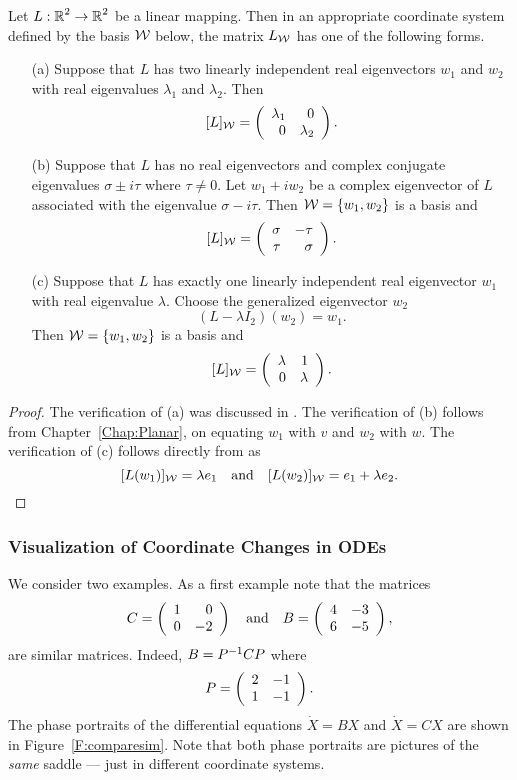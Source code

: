 \documentclass{ximera}
\begin{document}
\begin{thm}  \label{T:putinform2}
Let $L:\mbox{$\Bbb{R}$}^2\to\mbox{$\Bbb{R}$}^2$ be a linear mapping.  Then in an appropriate
coordinate system defined by the basis ${\cal W}$ below, the matrix
$L_{\cal W}$ has one of the following forms.
\begin{itemize}
\item[(a)]	Suppose that $L$ has two linearly independent
real eigenvectors $w_1$ and $w_2$ with real eigenvalues $\lambda_1$
and $\lambda_2$.  Then
\[
[L]_{\cal W} = \left(\begin{array}{rr} \lambda_1 & 0\\ 0 &\lambda_2\end{array}\right).
\]

\item[(b)]	Suppose that $L$ has no real eigenvectors and
complex conjugate eigenvalues $\sigma\pm i\tau$ where
$\tau\neq 0$.  Let $w_1+iw_2$ be a complex eigenvector of $L$
associated with the eigenvalue $\sigma-i\tau$.
Then ${\cal W}=\{w_1,w_2\}$ is a basis and
\[
[L]_{\cal W} = \left(\begin{array}{rr} \sigma & -\tau\\ \tau &\sigma\end{array}\right).
\]

\item[(c)]	Suppose that $L$ has exactly one linearly
independent real eigenvector $w_1$ with real eigenvalue $\lambda$.
Choose the generalized eigenvector $w_2$
\begin{equation}  \label{e:Lw=lw+v}
(L-\lambda I_2)(w_2) =  w_1.
\end{equation}
Then ${\cal W}=\{w_1,w_2\}$ is a basis and
\[
[L]_{\cal W} = \left(\begin{array}{rr} \lambda & 1\\ 0 &\lambda\end{array}\right).
\]
\end{itemize}
\end{thm}

\begin{proof}
The verification of (a) was discussed in .  The
verification of (b) follows from Chapter~\ref{Chap:Planar},
 on equating $w_1$ with $v$ and $w_2$ with $w$.
The verification of (c) follows directly from  as
\[
[L(w_1)]_{\cal W} = \lambda e_1 \quad\mbox{and}\quad [L(w_2)]_{\cal W} = e_1+\lambda e_2.
\]
\end{proof}



\subsubsection*{Visualization of Coordinate Changes in ODEs}

We consider two examples.  As a first example note that the matrices
\[
C = \left(\begin{array}{rr} 1 & 0\\ 0 &-2\end{array}\right) \quad\mbox{and}\quad B = \left(\begin{array}{rr} 4 & -3\\ 6 &-5\end{array}\right),
\]
are similar matrices.   Indeed, $B = P^{-1} CP$ where
\begin{equation}  \label{e:Pchange}
P = \left(\begin{array}{rr} 2 & -1\\ 1 &-1\end{array}\right).
\end{equation}
The phase portraits of the differential equations $\dot{X}=BX$ and
$\dot{X}=CX$ are shown in Figure~\ref{F:comparesim}.  Note that both
phase portraits are pictures of the {\em same\/} saddle ---
just in different coordinate systems.
\end{document}
